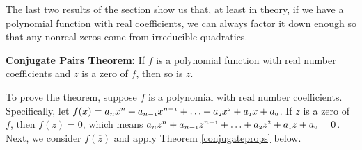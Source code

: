 \smallskip

The last two results of the section show us that, at least in theory, if we have a polynomial function with real coefficients, we can always factor it down enough so that any nonreal zeros come from irreducible quadratics.

\smallskip

\colorbox{ResultColor}{\bbm

\begin{thm} \label{conjugatepairsthm}\textbf{Conjugate Pairs Theorem:} If $f$ is a polynomial function with real number coefficients and $z$ is a zero of $f$, then so is $\overline{z}$. 

\end{thm}

\ebm}

\smallskip

To prove the theorem, suppose $f$ is a polynomial with real number coefficients.  Specifically, let 
$ f(x) = a_{n} x^{n} + a_{n-\mbox{\tiny$1$}} x^{n-\mbox{\tiny$1$}} + \ldots + a_{\mbox{\tiny $2$}} x^{\mbox{\tiny $2$}} + a_{\mbox{\tiny $1$}} x + a_{\mbox{\tiny $0$}}$.  If $z$ is a zero of $f$, then $f(z) = 0$, which means $a_{n} z^{n} + a_{n-\mbox{\tiny$1$}} z^{n-\mbox{\tiny$1$}} + \ldots + a_{\mbox{\tiny $2$}} z^{\mbox{\tiny $2$}} + a_{\mbox{\tiny $1$}} z + a_{\mbox{\tiny $0$}} = 0$.  Next, we consider $f\left(\overline{z}\right)$ and apply Theorem \ref{conjugateprops} below.

